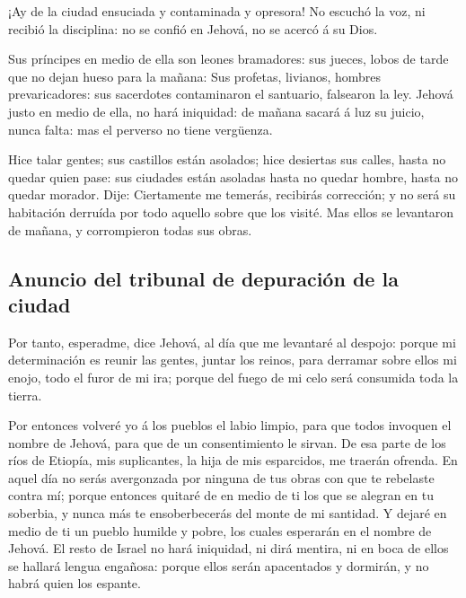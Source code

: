  ¡Ay de la ciudad ensuciada y contaminada y opresora!
 No escuchó la voz, ni recibió la disciplina: no se confió
en Jehová, no se acercó á su Dios.

 Sus príncipes en medio de ella son leones bramadores: sus
jueces, lobos de tarde que no dejan hueso para la mañana: 
Sus profetas, livianos, hombres prevaricadores: sus sacerdotes
contaminaron el santuario, falsearon la ley.  Jehová justo
en medio de ella, no hará iniquidad: de mañana sacará á luz su juicio,
nunca falta: mas el perverso no tiene vergüenza.

 Hice talar gentes; sus castillos están asolados; hice
desiertas sus calles, hasta no quedar quien pase: sus ciudades están
asoladas hasta no quedar hombre, hasta no quedar morador. 
Dije: Ciertamente me temerás, recibirás corrección; y no será su
habitación derruída por todo aquello sobre que los visité. Mas ellos se
levantaron de mañana, y corrompieron todas sus obras.

\hypertarget{anuncio-del-tribunal-de-depuraciuxf3n-de-la-ciudad}{%
\subsection{Anuncio del tribunal de depuración de la
ciudad}\label{anuncio-del-tribunal-de-depuraciuxf3n-de-la-ciudad}}

 Por tanto, esperadme, dice Jehová, al día que me levantaré
al despojo: porque mi determinación es reunir las gentes, juntar los
reinos, para derramar sobre ellos mi enojo, todo el furor de mi ira;
porque del fuego de mi celo será consumida toda la tierra.

 Por entonces volveré yo á los pueblos el labio limpio, para
que todos invoquen el nombre de Jehová, para que de un consentimiento le
sirvan.  De esa parte de los ríos de Etiopía, mis
suplicantes, la hija de mis esparcidos, me traerán ofrenda.
 En aquel día no serás avergonzada por ninguna de tus obras
con que te rebelaste contra mí; porque entonces quitaré de en medio de
ti los que se alegran en tu soberbia, y nunca más te ensoberbecerás del
monte de mi santidad.  Y dejaré en medio de ti un pueblo
humilde y pobre, los cuales esperarán en el nombre de Jehová.
 El resto de Israel no hará iniquidad, ni dirá mentira, ni
en boca de ellos se hallará lengua engañosa: porque ellos serán
apacentados y dormirán, y no habrá quien los espante.

